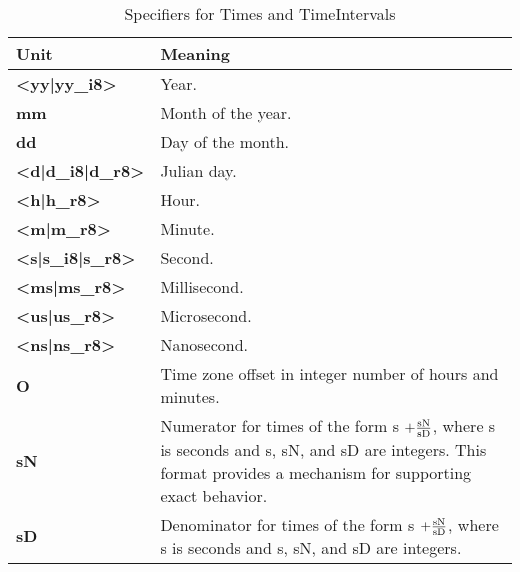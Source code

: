 \newpage
\begin{center}
\begin{table}
\caption{\label{table:timeOpts}Specifiers for Times and TimeIntervals}
\begin{tabular}{|p{1in}|p{3.5in}|}
\hline
Unit & Meaning \\
\hline\hline
{\bf <yy|yy\_i8>} & Year. \\
\hline
{\bf mm} & Month of the year. \\
\hline
{\bf dd} & Day of the month. \\
\hline
{\bf <d|d\_i8|d\_r8>} & Julian day. \\
\hline
{\bf <h|h\_r8>} & Hour. \\
\hline
{\bf <m|m\_r8>} & Minute. \\
\hline
{\bf <s|s\_i8|s\_r8>} & Second. \\
\hline
{\bf <ms|ms\_r8>} & Millisecond. \\
\hline
{\bf <us|us\_r8>} & Microsecond. \\
\hline
{\bf <ns|ns\_r8>} & Nanosecond. \\
\hline
{\bf O} & Time zone offset in integer number of hours and minutes. \\
\hline
{\bf sN} & Numerator for times of the form s {\bf $ + 
\frac{{\rm sN}}{{\rm sD}}$}, where s is seconds and s, sN, and
sD are integers.  This format provides a mechanism for supporting
exact behavior. \\
\hline
{\bf sD} & Denominator for times of the form s {\bf $ + 
\frac{{\rm sN}}{{\rm sD}}$}, where s is seconds and s, sN, and
sD are integers. \\
\hline
\end{tabular}
\end{table}
\end{center}
